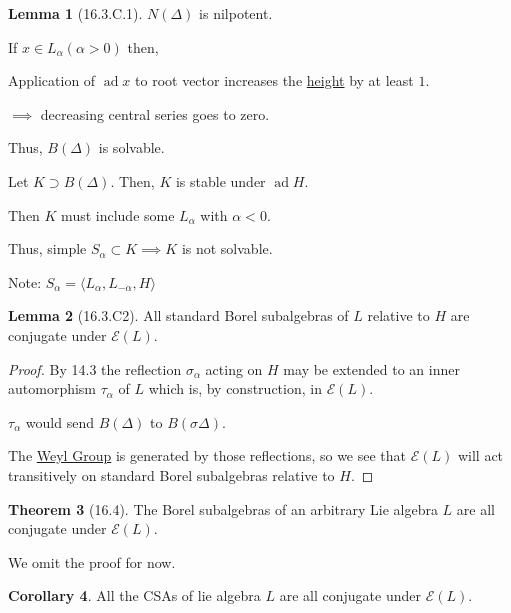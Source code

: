 \documentclass{article}
\theoremstyle{definition}
\newtheorem{theorem}{Theorem}
\newtheorem{lemma}[theorem]{Lemma}
\newtheorem{corollary}[theorem]{Corollary}
\begin{document}
    \begin{lemma}
        [16.3.C.1]

        \(N(\Delta)\) is nilpotent.

        If \(x\in L_\alpha (\alpha > 0)\) then,

        Application of \(\operatorname{ad} x\) to root vector increases the \underline{height} by at least \(1\).

        \(\implies\) decreasing central series goes to zero.

        Thus, \(B(\Delta)\) is solvable.

        Let \(K \supset B(\Delta)\). Then, \(K\) is stable under \(\operatorname{ad} H\).

        Then \(K\) must include some \(L_\alpha\) with \(\alpha < 0\).

        Thus, simple \(S_\alpha \subset K \implies K\) is not solvable.

    \end{lemma}

    Note: \(S_\alpha = \langle L_\alpha , L_{-\alpha}, H \rangle \) 

    \begin{lemma}
        [16.3.C2] All standard Borel subalgebras of \(L\) relative to \(H\) are conjugate under \(\mathscr{E} (L)\).
    \end{lemma}

    \begin{proof}
        By 14.3 the reflection \(\sigma_\alpha\) acting on \(H\) may be extended to an inner automorphism \(\tau_\alpha\) of \(L\) which is, by construction, in \(\mathscr{E}(L)\).

        \(\tau_\alpha\) would send \(B(\Delta)\) to \(B(\sigma\Delta)\).

        The \underline{Weyl Group} is generated by those reflections, so we see that \(\mathscr{E}(L)\) will act transitively on standard Borel subalgebras relative to \(H\).

    \end{proof}

    \begin{theorem}
        [16.4] The Borel subalgebras of an arbitrary Lie algebra \(L\) are all conjugate under \(\mathscr{E}(L)\).
    \end{theorem}

    We omit the proof for now.

    \begin{corollary}
        All the CSAs of lie algebra \(L\) are all conjugate under \(\mathscr{E}(L)\). 
    \end{corollary}
\end{document}

